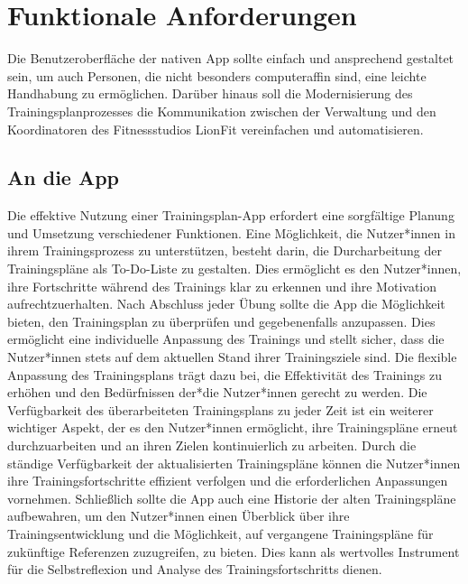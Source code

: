 \section{Funktionale Anforderungen}
Die Benutzeroberfläche der nativen App sollte einfach und ansprechend gestaltet sein, um auch Personen, die nicht besonders computeraffin sind, eine leichte Handhabung zu ermöglichen. Darüber hinaus soll die Modernisierung des Trainingsplanprozesses die Kommunikation zwischen der Verwaltung und den Koordinatoren des Fitnessstudios LionFit vereinfachen und automatisieren.

\subsection{An die App}
Die effektive Nutzung einer Trainingsplan-App erfordert eine sorgfältige Planung und Umsetzung verschiedener Funktionen. Eine Möglichkeit, die Nutzer*innen in ihrem Trainingsprozess zu unterstützen, besteht darin, die Durcharbeitung der Trainingspläne als To-Do-Liste zu gestalten. Dies ermöglicht es den Nutzer*innen, ihre Fortschritte während des Trainings klar zu erkennen und ihre Motivation aufrechtzuerhalten.
\newline
\newline
Nach Abschluss jeder Übung sollte die App die Möglichkeit bieten, den Trainingsplan zu überprüfen und gegebenenfalls anzupassen. Dies ermöglicht eine individuelle Anpassung des Trainings und stellt sicher, dass die Nutzer*innen stets auf dem aktuellen Stand ihrer Trainingsziele sind. Die flexible Anpassung des Trainingsplans trägt dazu bei, die Effektivität des Trainings zu erhöhen und den Bedürfnissen der*die Nutzer*innen gerecht zu werden.
\newpage
Die Verfügbarkeit des überarbeiteten Trainingsplans zu jeder Zeit ist ein weiterer wichtiger Aspekt, der es den Nutzer*innen ermöglicht, ihre Trainingspläne erneut durchzuarbeiten und an ihren Zielen kontinuierlich zu arbeiten. Durch die ständige Verfügbarkeit der aktualisierten Trainingspläne können die Nutzer*innen ihre Trainingsfortschritte effizient verfolgen und die erforderlichen Anpassungen vornehmen.
\newline
\newline
Schließlich sollte die App auch eine Historie der alten Trainingspläne aufbewahren, um den Nutzer*innen einen Überblick über ihre Trainingsentwicklung und die Möglichkeit, auf vergangene Trainingspläne für zukünftige Referenzen zuzugreifen, zu bieten. Dies kann als wertvolles Instrument für die Selbstreflexion und Analyse des Trainingsfortschritts dienen.

